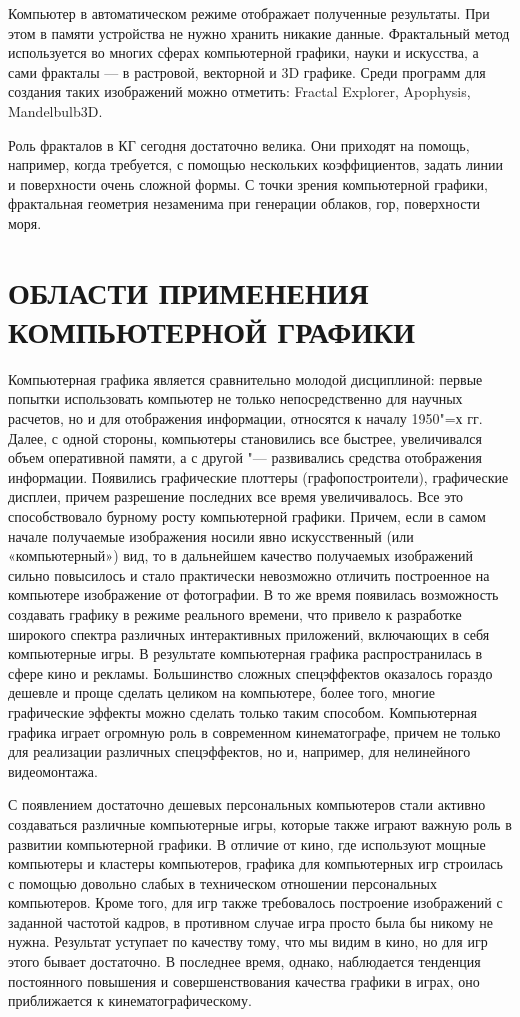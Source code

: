 \documentclass[referat]{SCWorks}
\begin{document}
Компьютер в автоматическом режиме отображает полученные результаты. При этом в памяти устройства не нужно хранить никакие данные. Фрактальный метод используется во многих сферах компьютерной графики, науки и искусства, а сами фракталы — в растровой, векторной и 3D графике. Среди программ для создания таких изображений можно отметить: Fractal Explorer, Apophysis, Mandelbulb3D\cite{GeekBrains}.

Роль фракталов в КГ сегодня достаточно велика. Они приходят на помощь, например, когда требуется, с помощью нескольких коэффициентов, задать линии и поверхности очень сложной формы. С точки зрения компьютерной графики, фрактальная геометрия незаменима при генерации облаков, гор, поверхности моря\cite{Peremitina2012}.



\section{ОБЛАСТИ ПРИМЕНЕНИЯ КОМПЬЮТЕРНОЙ ГРАФИКИ}
Компьютерная графика является сравнительно молодой дисциплиной: первые попытки использовать компьютер не только непосредственно для научных расчетов, но и для отображения информации, относятся к началу 1950"=х гг. Далее, с одной стороны, компьютеры становились все быстрее, увеличивался объем оперативной памяти, а с другой "--- развивались средства отображения информации. Появились графические плоттеры (графопостроители), графические дисплеи, причем разрешение последних все время увеличивалось. Все это способствовало бурному росту компьютерной графики. Причем, если в самом начале получаемые изображения носили явно искусственный (или «компьютерный») вид, то в дальнейшем качество получаемых изображений сильно повысилось и стало практически невозможно отличить построенное на компьютере изображение от фотографии. В то же время появилась возможность создавать графику в режиме реального времени, что привело к разработке широкого спектра различных интерактивных приложений, включающих в себя компьютерные игры. В результате компьютерная графика распространилась в сфере кино и рекламы. Большинство сложных спецэффектов оказалось гораздо дешевле и проще сделать целиком на компьютере, более того, многие графические эффекты можно сделать только таким способом. Компьютерная графика играет огромную роль в современном кинематографе, причем не только для реализации различных спецэффектов, но и, например, для нелинейного видеомонтажа\cite{Boreskov2017}.

С появлением достаточно дешевых персональных компьютеров стали активно создаваться различные компьютерные игры, которые также играют важную роль в развитии компьютерной графики. В отличие от кино, где используют мощные компьютеры и кластеры компьютеров, графика для компьютерных игр строилась с помощью довольно слабых в техническом отношении персональных компьютеров. Кроме того, для игр также требовалось построение изображений с заданной частотой кадров, в противном случае игра просто была бы никому не нужна. Результат уступает по качеству тому, что мы видим в кино, но для игр этого бывает достаточно. В последнее время, однако, наблюдается тенденция постоянного повышения и совершенствования качества графики в играх, оно приближается к кинематографическому. 
\end{document}
